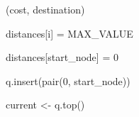 \documentclass[12pt]{article}
\begin{document}
\begin{adjustwidth}{0.5in}{0.0in}
\begin{justify}
{\fontsize{8pt}{9.6pt}\selectfont  \tabto{0.75in} \tab \tab (cost, destination)\par}
\end{justify}\par

\end{adjustwidth}

\begin{adjustwidth}{0.5in}{0.0in}
\begin{justify}
 \tabto{0.75in} 
\end{justify}\par

\end{adjustwidth}

\begin{adjustwidth}{0.5in}{0.0in}
\begin{justify}
{\fontsize{8pt}{9.6pt}\selectfont  \tabto{0.75in} \tab \tab distances[i] = MAX\_VALUE\par}
\end{justify}\par

\end{adjustwidth}

\begin{justify}
{\fontsize{8pt}{9.6pt}\selectfont  \tabto{0.75in} \tab distances[start\_node] = 0\par}
\end{justify}\par

\begin{justify}
{\fontsize{8pt}{9.6pt}\selectfont  \tabto{0.75in} \tab q.insert(pair(0, start\_node))\par}
\end{justify}\par

\begin{justify}
 \tabto{0.75in} 
\end{justify}\par

\begin{justify}
{\fontsize{8pt}{9.6pt}\selectfont  \tabto{0.75in} \tab \tab current <- q.top()\par}
\end{justify}\par
\end{document}
